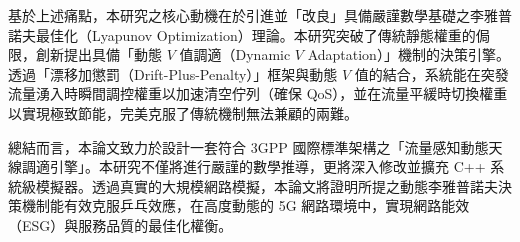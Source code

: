 基於上述痛點，本研究之核心動機在於引進並「改良」具備嚴謹數學基礎之李雅普諾夫最佳化（Lyapunov Optimization）理論。本研究突破了傳統靜態權重的侷限，創新提出具備「動態 $V$ 值調適（Dynamic $V$ Adaptation）」機制的決策引擎。透過「漂移加懲罰（Drift-Plus-Penalty）」框架與動態 $V$ 值的結合，系統能在突發流量湧入時瞬間調控權重以加速清空佇列（確保 QoS），並在流量平緩時切換權重以實現極致節能，完美克服了傳統機制無法兼顧的兩難。

總結而言，本論文致力於設計一套符合 3GPP 國際標準架構之「流量感知動態天線調適引擎」。本研究不僅將進行嚴謹的數學推導，更將深入修改並擴充 C++ 系統級模擬器。透過真實的大規模網路模擬，本論文將證明所提之動態李雅普諾夫決策機制能有效克服乒乓效應，在高度動態的 5G 網路環境中，實現網路能效（ESG）與服務品質的最佳化權衡。